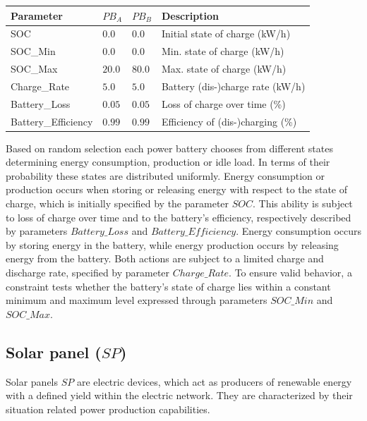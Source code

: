 \begin{table}[h]
	\renewcommand{\arraystretch}{1.3}
	\centering
	\begin{tabularx}{\columnwidth}{lllX}
		\hline
		\textbf{Parameter}     & \textbf{$PB_{A}$} & \textbf{$PB_{B}$} & \textbf{Description} \\ \hline
		SOC                     & $0.0$ & $0.0$ & Initial state of charge (kW/h)                   \\
		SOC\_Min                & $0.0$ & $0.0$ & Min. state of charge (kW/h)                   \\
		SOC\_Max               & $20.0$ & $80.0$ &  Max. state of charge (kW/h)                    \\
		Charge\_Rate            & $5.0$ & $5.0$ & Battery (dis-)charge rate (kW/h)     \\ 
		Battery\_Loss           & $0.05$ & $0.05$ & Loss of charge over time (\%)\\
		Battery\_Efficiency      & $0.99$ & $0.99$ &Efficiency of (dis-)charging (\%)     \\ \hline
	\end{tabularx}
\end{table}

Based on random selection each power battery chooses from different states determining energy consumption, production or idle load. In terms of their probability these states are distributed uniformly. Energy consumption or production occurs when storing or releasing energy with respect to the state of charge, which is initially specified by the parameter $SOC$. This ability is subject to loss of charge over time and to the battery's efficiency, respectively described by parameters $Battery\_Loss$ and $Battery\_Efficiency$. Energy consumption occurs by storing energy in the battery, while energy production occurs by releasing energy from the battery. Both actions are subject to a limited charge and discharge rate, specified by parameter $Charge\_Rate$. To ensure valid behavior, a constraint tests whether the battery's state of charge lies within a constant minimum and maximum level expressed through parameters $SOC\_Min$ and $SOC\_Max$.

\subsection{Solar panel ($SP$)}

Solar panels $SP$ are electric devices, which act as producers of renewable energy with a defined yield within the electric network. They are characterized by their situation related power production capabilities. 

